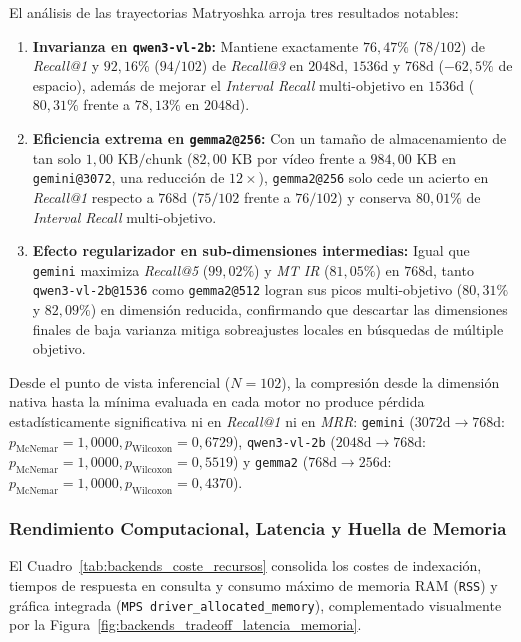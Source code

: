 El análisis de las trayectorias Matryoshka arroja tres resultados notables:
\begin{enumerate}
    \item \textbf{Invarianza en \texttt{qwen3-vl-2b}:} Mantiene exactamente $76,47\%$ ($78/102$) de \textit{Recall@1} y $92,16\%$ ($94/102$) de \textit{Recall@3} en $2048\text{d}$, $1536\text{d}$ y $768\text{d}$ ($-62,5\%$ de espacio), además de mejorar el \textit{Interval Recall} multi-objetivo en $1536\text{d}$ ($80,31\%$ frente a $78,13\%$ en $2048\text{d}$).
    \item \textbf{Eficiencia extrema en \texttt{gemma2@256}:} Con un tamaño de almacenamiento de tan solo $1,00\text{ KB/chunk}$ ($82,00\text{ KB}$ por vídeo frente a $984,00\text{ KB}$ en \texttt{gemini@3072}, una reducción de $12\times$), \texttt{gemma2@256} solo cede un acierto en \textit{Recall@1} respecto a $768\text{d}$ ($75/102$ frente a $76/102$) y conserva $80,01\%$ de \textit{Interval Recall} multi-objetivo.
    \item \textbf{Efecto regularizador en sub-dimensiones intermedias:} Igual que \texttt{gemini} maximiza \textit{Recall@5} ($99,02\%$) y \textit{MT IR} ($81,05\%$) en $768\text{d}$, tanto \texttt{qwen3-vl-2b@1536} como \texttt{gemma2@512} logran sus picos multi-objetivo ($80,31\%$ y $82,09\%$) en dimensión reducida, confirmando que descartar las dimensiones finales de baja varianza mitiga sobreajustes locales en búsquedas de múltiple objetivo.
\end{enumerate}

Desde el punto de vista inferencial ($N=102$), la compresión desde la dimensión nativa hasta la mínima evaluada en cada motor no produce pérdida estadísticamente significativa ni en \textit{Recall@1} ni en \textit{MRR}: \texttt{gemini} ($3072\text{d} \to 768\text{d}$: $p_{\text{McNemar}} = 1,0000, p_{\text{Wilcoxon}} = 0,6729$), \texttt{qwen3-vl-2b} ($2048\text{d} \to 768\text{d}$: $p_{\text{McNemar}} = 1,0000, p_{\text{Wilcoxon}} = 0,5519$) y \texttt{gemma2} ($768\text{d} \to 256\text{d}$: $p_{\text{McNemar}} = 1,0000, p_{\text{Wilcoxon}} = 0,4370$).

\subsubsection{Rendimiento Computacional, Latencia y Huella de Memoria}
\label{subsubsec:rendimiento_memoria_backends}

El Cuadro~\ref{tab:backends_coste_recursos} consolida los costes de indexación, tiempos de respuesta en consulta y consumo máximo de memoria RAM (\texttt{RSS}) y gráfica integrada (\texttt{MPS driver\_allocated\_memory}), complementado visualmente por la Figura~\ref{fig:backends_tradeoff_latencia_memoria}.

